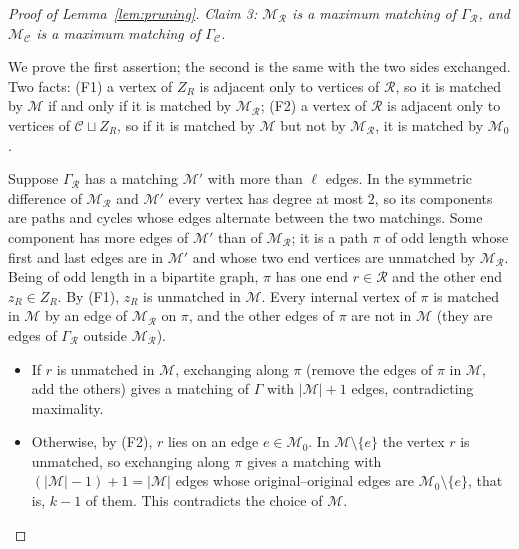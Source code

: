 \documentclass[11pt]{article}
\theoremstyle{remark}
\newcommand{\abs}[1]{\lvert #1\rvert}
\newcommand{\cR}{\mathcal R}
\newcommand{\cC}{\mathcal C}
\newcommand{\cM}{\mathcal M}
\begin{document}
\begin{proof}[Proof of Lemma~\ref{lem:pruning}]
\emph{Claim 3: $\cM_{\cR}$ is a maximum matching of $\Gamma_{\cR}$, and
$\cM_{\cC}$ is a maximum matching of $\Gamma_{\cC}$.}

We prove the first assertion; the second is the same with the two sides
exchanged. Two facts: (F1) a vertex of $Z_R$ is adjacent only to vertices
of $\cR$, so it is matched by $\cM$ if and only if it is matched by
$\cM_{\cR}$; (F2) a vertex of $\cR$ is adjacent only to vertices of
$\cC\sqcup Z_R$, so if it is matched by $\cM$ but not by $\cM_{\cR}$, it is
matched by $\cM_0$.

Suppose $\Gamma_{\cR}$ has a matching $\cM'$ with more than $\ell$ edges.
In the symmetric difference of $\cM_{\cR}$ and $\cM'$ every vertex has
degree at most $2$, so its components are paths and cycles whose edges
alternate between the two matchings. Some component has more edges of $\cM'$
than of $\cM_{\cR}$; it is a path $\pi$ of odd length whose first and last
edges are in $\cM'$ and whose two end vertices are unmatched by
$\cM_{\cR}$. Being of odd length in a bipartite graph, $\pi$ has one end
$r\in\cR$ and the other end $z_R\in Z_R$. By (F1), $z_R$ is unmatched in
$\cM$. Every internal vertex of $\pi$ is matched in $\cM$ by an edge of
$\cM_{\cR}$ on $\pi$, and the other edges of $\pi$ are not in $\cM$ (they
are edges of $\Gamma_{\cR}$ outside $\cM_{\cR}$).
\begin{itemize}[leftmargin=2em]
\item If $r$ is unmatched in $\cM$, exchanging along $\pi$ (remove the edges
of $\pi$ in $\cM$, add the others) gives a matching of $\Gamma$ with
$\abs\cM+1$ edges, contradicting maximality.
\item Otherwise, by (F2), $r$ lies on an edge $e\in\cM_0$. In
$\cM\setminus\{e\}$ the vertex $r$ is unmatched, so exchanging along $\pi$
gives a matching with $(\abs\cM-1)+1=\abs\cM$ edges whose
original--original edges are $\cM_0\setminus\{e\}$, that is, $k-1$ of them.
This contradicts the choice of $\cM$.
\end{itemize}


\end{proof}
\end{document}
